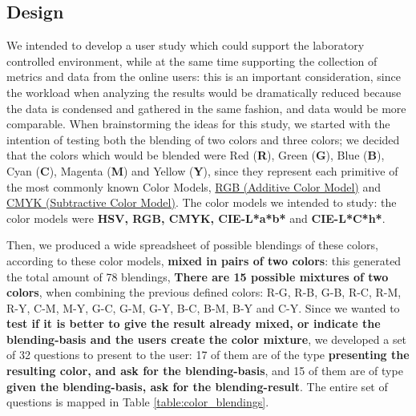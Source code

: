 \subsection{Design}
%
We intended to develop a user study which could support the laboratory controlled
environment, while at the same time supporting the collection of metrics and data from the
online users: this is an important consideration, since the workload when analyzing the
results would be dramatically reduced because the data is condensed and gathered in the same
fashion, and data would be more comparable. When brainstorming the ideas for this study, we started
with the intention of testing both the blending of two colors and three colors; we decided that the
colors which would be blended were Red (\textbf{R}), Green (\textbf{G}), Blue (\textbf{B}), Cyan
(\textbf{C}), Magenta (\textbf{M}) and Yellow (\textbf{Y}), since they represent each primitive of
the most commonly known Color Models, \ul{RGB (Additive Color Model)} and \ul{CMYK (Subtractive Color Model)}.
The color models we intended to study: the color models were \textbf{HSV, RGB, CMYK, CIE-L*a*b*} and
\textbf{CIE-L*C*h*}. \par
%
Then, we produced a wide spreadsheet of possible blendings of these colors, according to these color models,
\textbf{mixed in pairs of two colors}: this generated the total amount of 78 blendings, \textbf{There are
15 possible mixtures of two colors}, when combining the previous defined colors: R-G, R-B, G-B, R-C, R-M,
R-Y, C-M, M-Y, G-C, G-M, G-Y, B-C, B-M, B-Y and C-Y. Since we wanted to \textbf{test if it is better to give
the result already mixed, or indicate the blending-basis and the users create the color mixture}, we developed
a set of 32 questions to present to the user: 17 of them are of the type \textbf{presenting the resulting
color, and ask for the blending-basis}, and 15 of them are of type \textbf{given the blending-basis, ask for
the blending-result}. The entire set of questions is mapped in Table \ref{table:color_blendings}.
%

